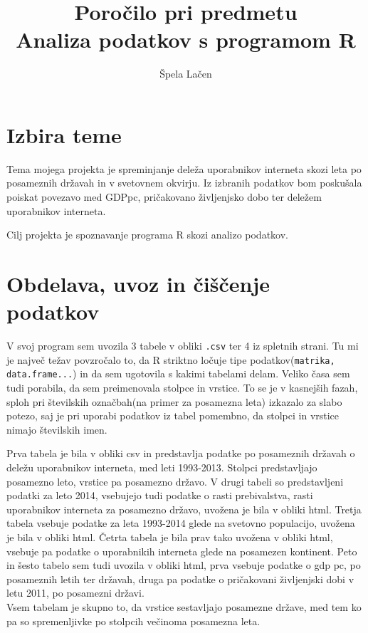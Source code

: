 \documentclass[11pt,a4paper]{article}
\begin{document}
\author{Špela Lačen}
\title{Poročilo pri predmetu \\
Analiza podatkov s programom R}
\maketitle

\section{Izbira teme}

Tema mojega projekta je spreminjanje deleža uporabnikov interneta skozi leta po posameznih državah in v svetovnem okvirju. Iz izbranih podatkov bom poskušala poiskat povezavo med  GDPpc, pričakovano življenjsko dobo ter deležem uporabnikov interneta. 

\bigskip 
Cilj projekta je spoznavanje programa R skozi analizo podatkov.

\section{Obdelava, uvoz in čiščenje podatkov}

V svoj program sem uvozila 3 tabele  v obliki \verb|.csv| ter 4 iz spletnih strani. Tu mi je največ težav povzročalo to, da R striktno ločuje tipe podatkov\-(\verb|matrika, data.frame...|) in da sem ugotovila s kakimi tabelami delam. Veliko časa sem tudi porabila, da sem preimenovala stolpce in vrstice. To se je v kasnejših fazah, sploh pri številskih označbah(na primer za posamezna leta) izkazalo za slabo potezo, saj je pri uporabi podatkov iz tabel pomembno, da stolpci in vrstice nimajo številskih imen. 

Prva tabela je bila v obliki csv in predstavlja podatke po posameznih državah o deležu uporabnikov interneta, med leti 1993-2013. Stolpci predstavljajo posamezno leto, vrstice pa posamezno državo.
V drugi tabeli so predstavljeni podatki za leto 2014, vsebujejo tudi podatke o rasti prebivalstva, rasti uporabnikov interneta za posamezno državo, uvožena je bila v obliki html.
Tretja tabela vsebuje podatke za leta 1993-2014 glede na svetovno populacijo, uvožena je bila v obliki html.
Četrta tabela je bila prav tako uvožena v obliki html, vsebuje pa podatke o uporabnikih interneta glede na posamezen kontinent. Peto in šesto tabelo sem tudi uvozila v obliki html, prva vsebuje podatke o gdp pc, po posameznih letih ter državah, druga pa podatke o pričakovani življenjski dobi v letu 2011, po posamezni državi.
\\Vsem tabelam je skupno to, da vrstice sestavljajo posamezne države, med tem ko pa so spremenljivke po stolpcih večinoma posamezna leta.
\end{document}
